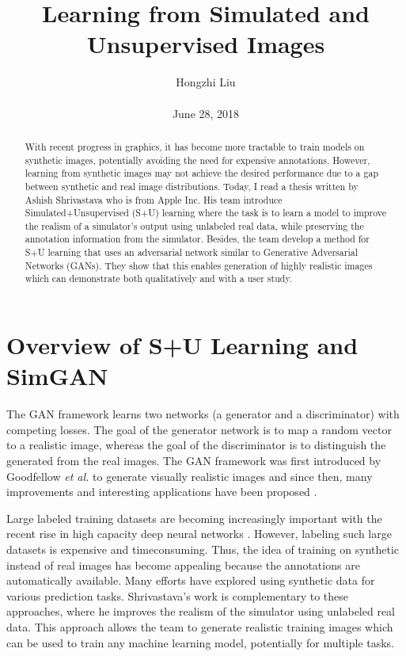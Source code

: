 \documentclass[10pt,twocolumn,letterpaper]{article}
\title{Learning from Simulated and Unsupervised Images}
\author{Hongzhi Liu\\\\
June 28, 2018}
\begin{document}
\maketitle
\begin{abstract}
	With recent progress in graphics, it has become more tractable to train models on synthetic images, potentially avoiding the need for expensive annotations. However, learning from synthetic images may not achieve the desired performance due to a gap between synthetic and real image distributions. Today, I read a thesis written by Ashish Shrivastava who is from Apple Inc. His team introduce Simulated+Unsupervised (S+U) learning where the task is to learn a model to improve the realism of a simulator's output using unlabeled real data, while preserving the annotation information from the simulator. Besides, the team develop a method for S+U learning that uses an adversarial network similar to Generative Adversarial Networks (GANs). They show that this enables generation of highly realistic images which can demonstrate both qualitatively and with a user study.
\end{abstract}
\section{Overview of S+U Learning and SimGAN}

The GAN framework learns two networks (a generator and a discriminator) with competing losses. The goal of the generator network is to map a random vector to a realistic image, whereas the goal of the discriminator is to distinguish the generated from the real images. The GAN framework was first introduced by Goodfellow \emph{et al.} \cite{Goodfellow2014Generative} to generate visually realistic images and since then, many improvements and interesting applications have been proposed \cite{Salimans2016Improved}. 

Large labeled training datasets are becoming increasingly important with the recent rise in high capacity deep neural networks \cite{Deng2009ImageNet}. However, labeling such large datasets is expensive and timeconsuming. Thus, the idea of training on synthetic instead of real images has become appealing because the annotations are automatically available. Many efforts have explored using synthetic data for various prediction tasks. Shrivastava's work is  complementary to these approaches, where he improves the realism of the simulator using unlabeled real data. This approach allows the team to generate realistic training images which can be used to train any machine learning model, potentially for multiple tasks.
\end{document}
